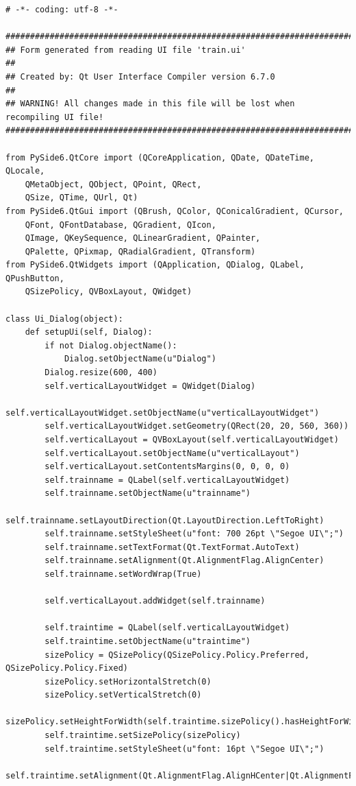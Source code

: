 \documentclass[a4paper,14pt]{extarticle}
\begin{document}
\begin{verbatim}
# -*- coding: utf-8 -*-

################################################################################
## Form generated from reading UI file 'train.ui'
##
## Created by: Qt User Interface Compiler version 6.7.0
##
## WARNING! All changes made in this file will be lost when recompiling UI file!
################################################################################

from PySide6.QtCore import (QCoreApplication, QDate, QDateTime, QLocale,
    QMetaObject, QObject, QPoint, QRect,
    QSize, QTime, QUrl, Qt)
from PySide6.QtGui import (QBrush, QColor, QConicalGradient, QCursor,
    QFont, QFontDatabase, QGradient, QIcon,
    QImage, QKeySequence, QLinearGradient, QPainter,
    QPalette, QPixmap, QRadialGradient, QTransform)
from PySide6.QtWidgets import (QApplication, QDialog, QLabel, QPushButton,
    QSizePolicy, QVBoxLayout, QWidget)

class Ui_Dialog(object):
    def setupUi(self, Dialog):
        if not Dialog.objectName():
            Dialog.setObjectName(u"Dialog")
        Dialog.resize(600, 400)
        self.verticalLayoutWidget = QWidget(Dialog)
        self.verticalLayoutWidget.setObjectName(u"verticalLayoutWidget")
        self.verticalLayoutWidget.setGeometry(QRect(20, 20, 560, 360))
        self.verticalLayout = QVBoxLayout(self.verticalLayoutWidget)
        self.verticalLayout.setObjectName(u"verticalLayout")
        self.verticalLayout.setContentsMargins(0, 0, 0, 0)
        self.trainname = QLabel(self.verticalLayoutWidget)
        self.trainname.setObjectName(u"trainname")
        self.trainname.setLayoutDirection(Qt.LayoutDirection.LeftToRight)
        self.trainname.setStyleSheet(u"font: 700 26pt \"Segoe UI\";")
        self.trainname.setTextFormat(Qt.TextFormat.AutoText)
        self.trainname.setAlignment(Qt.AlignmentFlag.AlignCenter)
        self.trainname.setWordWrap(True)

        self.verticalLayout.addWidget(self.trainname)

        self.traintime = QLabel(self.verticalLayoutWidget)
        self.traintime.setObjectName(u"traintime")
        sizePolicy = QSizePolicy(QSizePolicy.Policy.Preferred, QSizePolicy.Policy.Fixed)
        sizePolicy.setHorizontalStretch(0)
        sizePolicy.setVerticalStretch(0)
        sizePolicy.setHeightForWidth(self.traintime.sizePolicy().hasHeightForWidth())
        self.traintime.setSizePolicy(sizePolicy)
        self.traintime.setStyleSheet(u"font: 16pt \"Segoe UI\";")
        self.traintime.setAlignment(Qt.AlignmentFlag.AlignHCenter|Qt.AlignmentFlag.AlignTop)


\end{verbatim}
\end{document}
